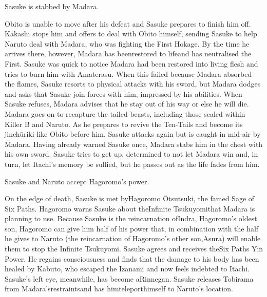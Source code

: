 \documentclass[a4paper,12pt]{article}
\begin{document}
Sasuke is stabbed by Madara.\\ \par \vspace{0.5cm}

Obito is unable to move after his defeat and Sasuke prepares to finish him off. Kakashi stops him and offers to deal with Obito himself, sending Sasuke to help Naruto deal with Madara, who was fighting the First Hokage. By the time he arrives there, however, Madara has beenrestored to lifeand has neutralised the First. Sasuke was quick to notice Madara had been restored into living flesh and tries to burn him with Amaterasu. When this failed because Madara absorbed the flames, Sasuke resorts to physical attacks with his sword, but Madara dodges and asks that Sasuke join forces with him, impressed by his abilities. When Sasuke refuses, Madara advises that he stay out of his way or else he will die. Madara goes on to recapture the tailed beasts, including those sealed within Killer B and Naruto. As he prepares to revive the Ten-Tails and become its jinchūriki like Obito before him, Sasuke attacks again but is caught in mid-air by Madara. Having already warned Sasuke once, Madara stabs him in the chest with his own sword. Sasuke tries to get up, determined to not let Madara win and, in turn, let Itachi's memory be sullied, but he passes out as the life fades from him.\\ \par \vspace{0.5cm}

Sasuke and Naruto accept Hagoromo's power.\\ \par \vspace{0.5cm}

On the edge of death, Sasuke is met byHagoromo Ōtsutsuki, the famed Sage of Six Paths. Hagoromo warns Sasuke about theInfinite Tsukuyomithat Madara is planning to use. Because Sasuke is the reincarnation ofIndra, Hagoromo's oldest son, Hagoromo can give him half of his power that, in combination with the half he gives to Naruto (the reincarnation of Hagoromo's other son,Asura) will enable them to stop the Infinite Tsukuyomi. Sasuke agrees and receives theSix Paths Yin Power. He regains consciousness and finds that the damage to his body has been healed by Kabuto, who escaped the Izanami and now feels indebted to Itachi. Sasuke's left eye, meanwhile, has become aRinnegan. Sasuke releases Tobirama from Madara'srestraintsand has himteleporthimself to Naruto's location.\\ \par \vspace{0.5cm}
\end{document}
